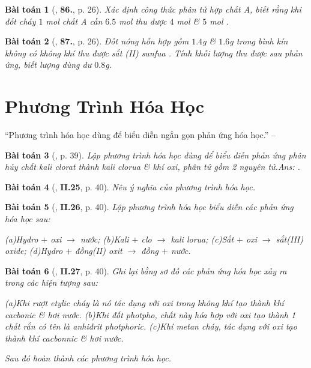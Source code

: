 \documentclass{article}
\numberwithin{equation}{section}
\newtheorem{baitoan}{Bài toán}
\begin{document}
\begin{baitoan}[\cite{An2011}, \textbf{86.}, p. 26]
	Xác định công thức phân tử hợp chất A, biết rằng khi đốt cháy $1$ mol chất A cần $6.5$ mol  thu được $4$ mol  \& $5$ mol .
\end{baitoan}

\begin{baitoan}[\cite{An2011}, \textbf{87.}, p. 26]
	Đốt nóng hỗn hợp gồm $1.4$g  \& $1.6$g  trong bình kín không có không khí thu được sắt (II) sunfua . Tính khối lượng  thu được sau phản ứng, biết lượng  dùng dư $0.8$g.
\end{baitoan}


\section{Phương Trình Hóa Học}
``Phương trình hóa học dùng để biểu diễn ngắn gọn phản ứng hóa học.'' -- \cite[p. 39]{Truong_BTNC_Hoa_Hoc_8_2022}

\begin{baitoan}[\cite{Truong_BTNC_Hoa_Hoc_8_2022}, p. 39]
	Lập phương trình hóa học dùng để biểu diễn phản ứng phân hủy chất kali clorat thành kali clorua \& khí oxi, phân tử gồm 2 nguyên tử.\hfill\textsf{Ans:} \emph{}.
\end{baitoan}

\begin{baitoan}[\cite{Truong_BTNC_Hoa_Hoc_8_2022}, \textbf{II.25}, p. 40]
	Nêu ý nghĩa của phương trình hóa học.
\end{baitoan}

\begin{baitoan}[\cite{Truong_BTNC_Hoa_Hoc_8_2022}, \textbf{II.26}, p. 40]
	Lập phương trình hóa học biểu diễn các phản ứng hóa học sau:
	
		(a)Hydro $+$ oxi $\to$ nước;
		(b)Kali $+$ clo $\to$ kali lorua;
		(c)Sắt $+$ oxi $\to$ sắt(III) oxide;
		(d)Hydro $+$ đồng(II) oxit $\to$ đồng $+$ nước.
	
\end{baitoan}

\begin{baitoan}[\cite{Truong_BTNC_Hoa_Hoc_8_2022}, \textbf{II.27}, p. 40]
	Ghi lại bằng sơ đồ các phản ứng hóa học xảy ra trong các hiện tượng sau:
	
		(a)Khi rượt etylic cháy là nó tác dụng với oxi trong không khí tạo thành khí cacbonic \& hơi nước.
		(b)Khi đốt photpho, chất này hóa hợp với oxi tạo thành 1 chất rắn có tên là anhiđrit photphoric.
		(c)Khí metan \emph{} cháy, tác dụng với oxi tạo thành khí cacbonnic \& hơi nước.
	
	Sau đó hoàn thành các phương trình hóa học.
\end{baitoan}
\end{document}
